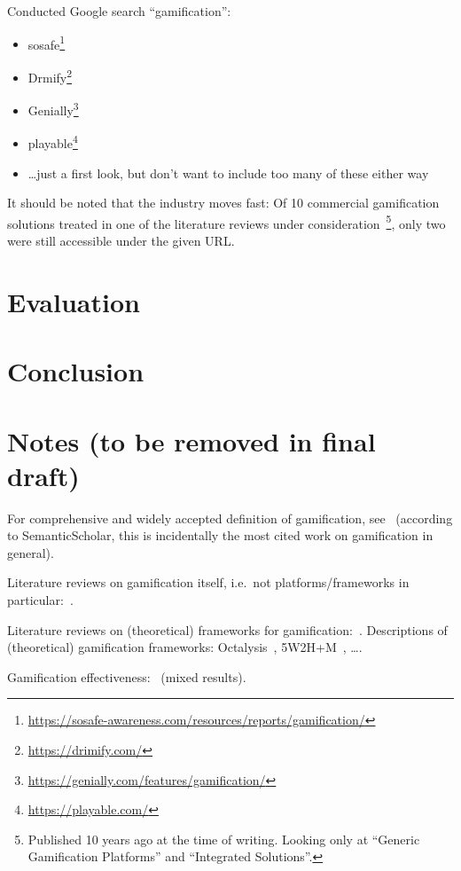 \documentclass[runningheads]{llncs}
\begin{document}
Conducted Google search \enquote{gamification}:
\begin{itemize}
    \item sosafe\footnote{\url{https://sosafe-awareness.com/resources/reports/gamification/}}
    \item Drmify\footnote{\url{https://drimify.com/}}
    \item Genially\footnote{\url{https://genially.com/features/gamification/}}
    \item playable\footnote{\url{https://playable.com/}}
    \item \ldots just a first look, but don't want to include too many of these either way
\end{itemize}
%
It should be noted that the industry moves fast: Of 10 commercial gamification solutions treated in one of the literature reviews under consideration~\cite{HeAWS15}\footnote{Published 10 years ago at the time of writing. Looking only at \enquote{Generic Gamification Platforms} and \enquote{Integrated Solutions}.}, only two were still accessible under the given URL\@.

\section{Evaluation}

\section{Conclusion}

\appendix

\section{Notes (to be removed in final draft)}

For comprehensive and widely accepted definition of gamification, see~\cite{DeDKN11} (according to SemanticScholar, this is incidentally the most cited work on gamification in general).

Literature reviews on gamification itself, i.e.\ not platforms/frameworks in particular:~\cite{Herz14, HaKS14}.

Literature reviews on (theoretical) frameworks for gamification:~\cite{MRGA15, MRGA17}. Descriptions of (theoretical) gamification frameworks: Octalysis~\cite{Chou15}, 5W2H+M~\cite{CoGS19, CoGS19a}, \ldots.

Gamification effectiveness:~\cite{SaHMM17, APLLAC24} (mixed results).

\printbibliography[]
\end{document}
